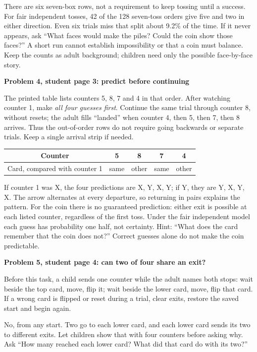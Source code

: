 \documentclass[11pt]{article}
\newcommand{\sub}[1]{\par\textbf{#1}\par}
\begin{document}
There are six seven-box rows, not a requirement to keep tossing until a success. For fair independent tosses, 42 of the 128 seven-toss orders give five and two in either direction. Even six trials miss that split about 9.2\% of the time. If it never appears, ask ``What faces would make the piles? Could the coin show those faces?'' A short run cannot establish impossibility or that a coin must balance. Keep the counts as adult background; children need only the possible face-by-face story.

\sub{Problem 4, student page 3: predict before continuing}
The printed table lists counters 5, 8, 7 and 4 in that order. After watching counter 1, make \emph{all four guesses first}. Continue the same trial through counter 8, without resets; the adult fills ``landed'' when counter 4, then 5, then 7, then 8 arrives. Thus the out-of-order rows do not require going backwards or separate trials. Keep a single arrival strip if needed.
\begin{center}
\begin{tabular}{ccccc}
\toprule
Counter & 5 & 8 & 7 & 4\\
\midrule
Card, compared with counter 1 & same & other & same & other\\
\bottomrule
\end{tabular}
\end{center}
If counter 1 was X, the four predictions are X, Y, X, Y; if Y, they are Y, X, Y, X. The arrow alternates at every departure, so returning in pairs explains the pattern. For the coin there is no guaranteed prediction: either exit is possible at each listed counter, regardless of the first toss. Under the fair independent model each guess has probability one half, not certainty. Hint: ``What does the card remember that the coin does not?'' Correct guesses alone do not make the coin predictable.

\sub{Problem 5, student page 4: can two of four share an exit?}
Before this task, a child sends one counter while the adult names both stops: wait beside the top card, move, flip it; wait beside the lower card, move, flip that card. If a wrong card is flipped or reset during a trial, clear exits, restore the saved start and begin again.

No, from any start. Two go to each lower card, and each lower card sends its two to different exits. Let children show that with four counters before asking why. Ask ``How many reached each lower card? What did that card do with its two?''
\end{document}
